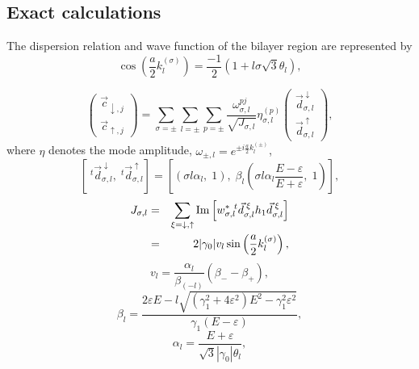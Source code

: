 \documentclass{jpsj3}
\begin{document}
\subsection{Exact calculations}
The dispersion relation and wave function of the bilayer region are represented by
\begin{equation}
\cos
\left(\frac{a}{2}k^{(\sigma)}_{l}\right) 
=\frac{-1}{2}\left(1+l \sigma \sqrt{3}\theta_l \right),
\label{k-D}
\end{equation}



\begin{equation}
\left(
\begin{array}{c}
\vec{c}_{\downarrow,j}
\\
\vec{c}_{\uparrow,j}
\end{array}
\right)
=
\sum_{\sigma=\pm}
\sum_{l=\pm}
\sum_{p=\pm}
\frac{\omega_{\sigma,l}^{pj}}
{\sqrt{J_{\sigma,l}}}
\eta^{(p)}_{\sigma,l}
\left(
\begin{array}{c}
\vec{d}^{\;\downarrow}_{\sigma,l}
\\
\vec{d}^{\;\uparrow}_{\sigma,l}
\end{array}
\right),
\label{wf-D}
\end{equation}
where $\eta$ denotes the mode amplitude, $\omega_{\pm, l}=e^{\pm i\frac{a}{2}k_l^{(\pm)}}$, 
\begin{equation}
\left[
\;^t\vec{d}_{\sigma,l}^{\;\downarrow},
\;^t\vec{d}_{\sigma,l}^{\;\uparrow}
\right]
=\left[ (\sigma l\alpha_{l}
,\;1),\;\beta_{l}
\left (\sigma l\alpha_{l} \frac{E-\varepsilon}{E+\varepsilon},\;1
\right)
\right],
\label{def-d}
\end{equation}
\begin{eqnarray}
J_{\sigma,l} &= & 
\sum_{\xi=\downarrow,\uparrow}{\rm Im}\left[w^*_{\sigma,l}
\!^t\vec{d}_{\sigma,l}^{\;\xi}h_1\vec{d}_{\sigma,l}^{\;\xi} \right]
\nonumber \\
&=& 2 |\gamma_0|v_l\sin\left(\frac{a}{2}k_l^{(\sigma)}\right),
\label{def-J}
\end{eqnarray}
\begin{equation} 
v_l=
\frac{\alpha_l}{\beta_{(-l)}}
\left(
\beta_{-}-\beta_+
\right),
\label{def-v} 
\end{equation}
\begin{equation}
\beta_{l}=\frac{2\varepsilon E - l
\sqrt{(\gamma_1^2+4\varepsilon^2)E^2-\gamma_1^2\varepsilon^2}
}{\gamma_1 (E-\varepsilon)},
\label{def-beta} 
\end{equation}
\begin{equation}
\alpha_l
=\frac{E+\varepsilon}
{\sqrt{3}|\gamma_0|\theta_l},
\label{def-alpha}
\end{equation}
\end{document}
